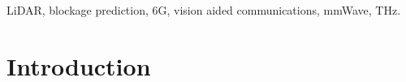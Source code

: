 \documentclass[conference]{IEEEtran}
\begin{document}
\begin{IEEEkeywords}
LiDAR, blockage prediction, 6G, vision aided communications, mmWave, THz.
\end{IEEEkeywords}






%
\IEEEpeerreviewmaketitle



\section{Introduction}
\end{document}
